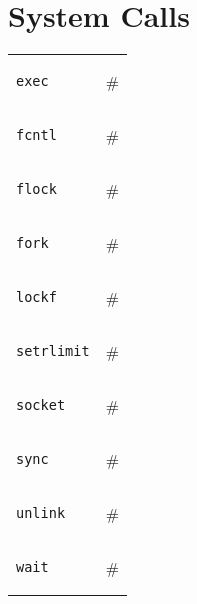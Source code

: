 \section{System Calls}

\begin{tabular}{l l}
\begin{lstlisting}
exec
\end{lstlisting} 
& \# \\

\begin{lstlisting}
fcntl
\end{lstlisting} 
& \# \\
\begin{lstlisting}
flock
\end{lstlisting} 
& \# \\
\begin{lstlisting}
fork
\end{lstlisting} 
& \# \\
\begin{lstlisting}
lockf
\end{lstlisting} 
& \# \\
\begin{lstlisting}
setrlimit
\end{lstlisting} 
& \# \\
\begin{lstlisting}
socket
\end{lstlisting} 
& \# \\
\begin{lstlisting}
sync
\end{lstlisting} 
& \# \\
\begin{lstlisting}
unlink
\end{lstlisting} 
& \# \\
\begin{lstlisting}
wait
\end{lstlisting} 
& \# \\\end{tabular}
